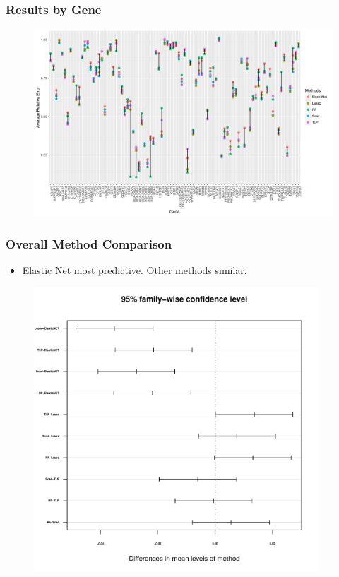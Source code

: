 \documentclass[table]{beamer}
\begin{document}
\begin{frame}
\frametitle{Results by Gene}
\begin{figure}[htbp]
  \centering
  \includegraphics[width=1.0\textwidth, height = 0.87\textheight]{RelErrorvsGenebyMethod}
\end{figure}
\end{frame}

\begin{frame}
\frametitle{Overall Method Comparison}
\begin{itemize}
  \item Elastic Net most predictive. Other methods similar.
\end{itemize}
\begin{figure}[htbp]
  \centering
  \includegraphics[width=0.95\textwidth, height = 0.76\textheight]{Tukeycompare}
\end{figure}
\end{frame}
\end{document}
